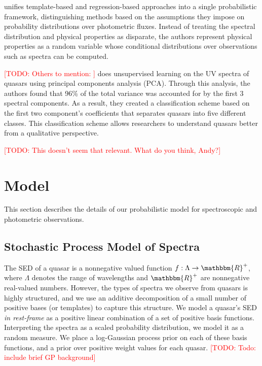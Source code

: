 \documentclass{article}
\newcommand{\R}{\mathbbm{R}}
\newcommand{\red}[1]{\textcolor{red}{[TODO: #1]}}
\begin{document}
\cite{budavari2009unified} unifies template-based and regression-based
approaches into a single probabilistic framework, distinguishing methods based on the assumptions they impose on probability distributions over photometric fluxes. Instead of treating the spectral distribution and physical properties as disparate, the authors represent physical properties as a random variable whose conditional distributions over observations such as spectra can be computed.

\red{Others to mention: }
\cite{suzuki2006quasar} does unsupervised learning on the UV spectra of quasars using principal components analysis (PCA). Through this analysis, the authors found that 96\% of the total variance was accounted for by the first 3 spectral components. As a result, they created a classification scheme based on the first two component's coefficients that separates quasars into five different classes. This classification scheme allows researchers to understand quasars better from a qualitative perspective.

\red{This doesn't seem that relevant. What do you think, Andy?}


\section{Model}
\label{sec:model}
This section describes the details of our probabilistic model for spectroscopic and photometric observations.  

\subsection{Stochastic Process Model of Spectra}
The SED of a quasar is a nonnegative valued function $f : \Lambda \rightarrow \R^+$, where $\Lambda$ denotes the range of wavelengths and $\R^+$ are nonnegative real-valued numbers.  However, the types of spectra we observe from quasars is highly structured, and we use an additive decomposition of a small number of positive bases (or templates) to capture this structure.   We model a quasar's SED \emph{in rest-frame} as a positive linear combination of a set of positive basis functions.  Interpreting the spectra as a scaled probability distribution, we model it as a random measure.  We place a log-Gaussian process prior on each of these basis functions, and a prior over positive weight values for each quasar.  
\red{Todo: include brief GP background}
\end{document}
